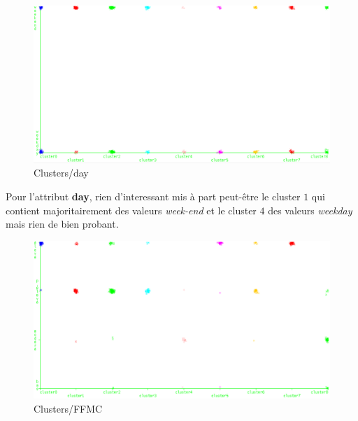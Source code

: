 \documentclass{article}
\begin{document}
\begin{sffamily}
\begin{figure}[h!]
    \begin{center}
    \includegraphics[width=\textwidth]{img_008.pdf}
    \caption{Clusters/day}
    \end{center}	
\end{figure}

Pour l'attribut \textbf{day}, rien d'interessant mis à part peut-être le cluster $1$ qui contient majoritairement des valeurs \textit{week-end} et 
le cluster $4$ des valeurs \textit{weekday} mais rien de bien probant.

\begin{figure}[h!]
    \begin{center}
    \includegraphics[width=\textwidth]{img_009.pdf}
    \caption{Clusters/FFMC}
    \end{center}	
\end{figure}


\end{sffamily}
\end{document}
